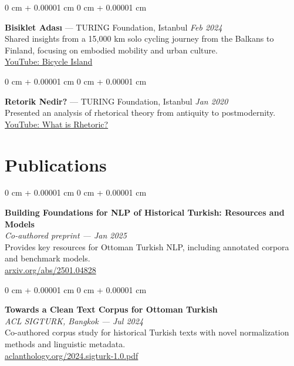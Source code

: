 \documentclass[10pt, letterpaper]{article}
\newenvironment{onecolentry}{
    \begin{adjustwidth}{
        0 cm + 0.00001 cm
    }{
        0 cm + 0.00001 cm
    }
}{
    \end{adjustwidth}
} %
\begin{document}
\begin{onecolentry}
    \textbf{Bisiklet Adası} — TURING Foundation, Istanbul \hfill \textit{Feb 2024} \\
    Shared insights from a 15,000 km solo cycling journey from the Balkans to Finland, focusing on embodied mobility and urban culture. \\
    \href{https://www.youtube.com/watch?v=U6dBbAe17cE&t=1s}{YouTube: Bicycle Island}
\end{onecolentry}
\vspace{0.2cm}

\begin{onecolentry}
    \textbf{Retorik Nedir?} — TURING Foundation, Istanbul \hfill \textit{Jan 2020} \\
    Presented an analysis of rhetorical theory from antiquity to postmodernity. \\
    \href{https://www.youtube.com/watch?v=Uji9Ntt8QOs&t=1s}{YouTube: What is Rhetoric?}
\end{onecolentry}

\section{Publications}

\begin{onecolentry}
    \textbf{Building Foundations for NLP of Historical Turkish: Resources and Models} \\
    \textit{Co-authored preprint — Jan 2025} \\
    Provides key resources for Ottoman Turkish NLP, including annotated corpora and benchmark models. \\
    \href{https://arxiv.org/abs/2501.04828}{arxiv.org/abs/2501.04828}
\end{onecolentry}
\vspace{0.2cm}

\begin{onecolentry}
    \textbf{Towards a Clean Text Corpus for Ottoman Turkish} \\
    \textit{ACL SIGTURK, Bangkok — Jul 2024} \\
    Co-authored corpus study for historical Turkish texts with novel normalization methods and linguistic metadata. \\
    \href{https://aclanthology.org/2024.sigturk-1.0.pdf}{aclanthology.org/2024.sigturk-1.0.pdf}
\end{onecolentry}
\vspace{0.2cm}
\end{document}
